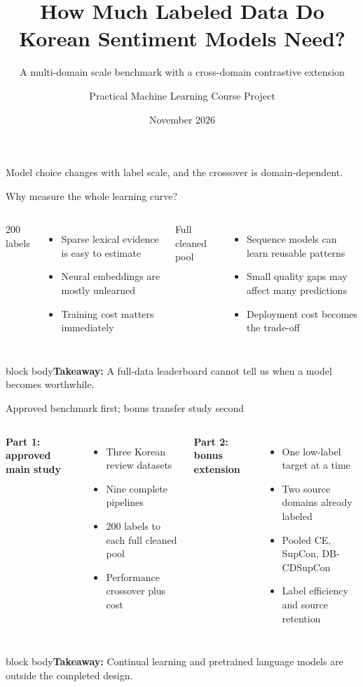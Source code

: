 \documentclass[aspectratio=169,12pt]{beamer}
\title{How Much Labeled Data Do Korean Sentiment Models Need?}
\subtitle{A multi-domain scale benchmark with a cross-domain contrastive extension}
\author{Practical Machine Learning Course Project}
\date{November 2026}
\newcommand{\takeaway}[1]{\vfill\begin{beamercolorbox}[sep=5pt,wd=\linewidth]{block body}\normalsize\textbf{Takeaway:} #1\end{beamercolorbox}}
\begin{document}
\begin{frame}[plain]
  \titlepage
  \vspace{-3mm}
  \centering
  \large Model choice changes with label scale, and the crossover is domain-dependent.
\end{frame}

\begin{frame}{Why measure the whole learning curve?}
  \begin{columns}[T]
    \Large\color{blue}200 labels
    \vspace{2mm}
    \begin{itemize}
      \item Sparse lexical evidence is easy to estimate
      \item Neural embeddings are mostly unlearned
      \item Training cost matters immediately
    \end{itemize}
    \Large\color{purple}Full cleaned pool
    \vspace{2mm}
    \begin{itemize}
      \item Sequence models can learn reusable patterns
      \item Small quality gaps may affect many predictions
      \item Deployment cost becomes the trade-off
    \end{itemize}
  \end{columns}
  \takeaway{A full-data leaderboard cannot tell us when a model becomes worthwhile.}
\end{frame}

\begin{frame}{Approved benchmark first; bonus transfer study second}
  \begin{columns}[T]
    \textbf{\color{blue}Part 1: approved main study}
    \begin{itemize}
      \item Three Korean review datasets
      \item Nine complete pipelines
      \item 200 labels to each full cleaned pool
      \item Performance crossover plus cost
    \end{itemize}
    \textbf{\color{purple}Part 2: bonus extension}
    \begin{itemize}
      \item One low-label target at a time
      \item Two source domains already labeled
      \item Pooled CE, SupCon, DB-CDSupCon
      \item Label efficiency and source retention
    \end{itemize}
  \end{columns}
  \takeaway{Continual learning and pretrained language models are outside the completed design.}
\end{frame}
\end{document}

